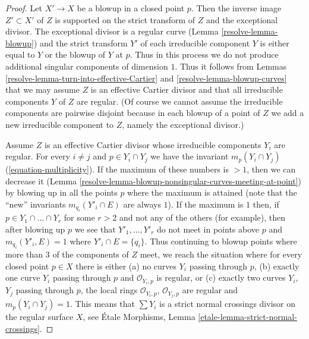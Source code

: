 \begin{proof}

Let $X' \to X$ be a blowup in a closed point $p$. Then the inverse image
$Z' \subset X'$ of $Z$ is supported on the strict transform of $Z$ and
the exceptional divisor. The exceptional divisor is a regular curve
(Lemma \ref{resolve-lemma-blowup}) and the strict transform $Y'$ of each irreducible
component $Y$ is either equal to $Y$ or the blowup of $Y$ at $p$.
Thus in this process we do not produce additional singular components
of dimension $1$. Thus it follows from
Lemmas \ref{resolve-lemma-turn-into-effective-Cartier} and \ref{resolve-lemma-blowup-curves}
that we may assume $Z$ is an effective Cartier divisor and
that all irreducible components $Y$ of $Z$ are regular.
(Of course we cannot assume the irreducible components are
pairwise disjoint because in each blowup of a point of $Z$
we add a new irreducible component to $Z$, namely the exceptional divisor.)

\medskip\noindent
Assume $Z$ is an effective Cartier divisor whose irreducible components
$Y_i$ are regular. For every $i \not = j$
and $p \in Y_i \cap Y_j$ we have the invariant
$m_p(Y_i \cap Y_j)$ (\ref{equation-multiplicity}).
If the maximum of these numbers is $> 1$, then we can decrease
it (Lemma \ref{resolve-lemma-blowup-nonsingular-curves-meeting-at-point})
by blowing up in all the points $p$ where the maximum is attained
(note that the ``new'' invariants $m_{q_i}(Y'_i \cap E)$ are always $1$).
If the maximum is $1$ then, if $p \in Y_1 \cap \ldots \cap Y_r$
for some $r > 2$ and not any of the others (for example), then after
blowing up $p$ we see that $Y'_1, \ldots, Y'_r$ do not meet in points
above $p$ and $m_{q_i}(Y'_i, E) = 1$ where $Y'_i \cap E = \{q_i\}$.
Thus continuing to blowup points where more than $3$
of the components of $Z$ meet, we reach the situation where
for every closed point $p \in X$ there is either
(a) no curves $Y_i$ passing through $p$,
(b) exactly one curve $Y_i$ passing through $p$ and $\mathcal{O}_{Y_i, p}$
is regular, or (c) exactly two curves $Y_i$, $Y_j$ passing through
$p$, the local rings $\mathcal{O}_{Y_i, p}$, $\mathcal{O}_{Y_j, p}$
are regular and $m_p(Y_i \cap Y_j) = 1$.
This means that $\sum Y_i$ is a strict normal crossings
divisor on the regular surface $X$, see
\'Etale Morphisms, Lemma
\ref{etale-lemma-strict-normal-crossings}.
\end{proof}

